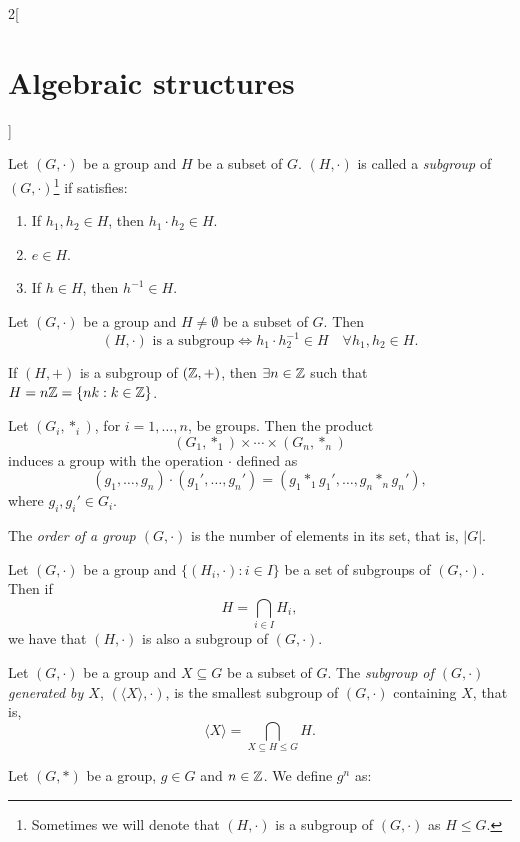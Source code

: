 \documentclass[../../../main.tex]{subfiles}
\begin{document}
\begin{multicols}{2}[\section{Algebraic structures}]
\begin{lemma}
\end{lemma}
\begin{definition}[Subgroup]
    Let $(G,\cdot)$ be a group and $H$ be a subset of $G$. $(H,\cdot)$ is called a \textit{subgroup} of $(G,\cdot)$\footnote{Sometimes we will denote that $(H,\cdot)$ is a subgroup of $(G,\cdot)$ as $H\leq G$.} if satisfies:
    \begin{enumerate}
        \item If $h_1,h_2\in H$, then $h_1\cdot h_2\in H$.
        \item $e\in H$.
        \item If $h\in H$, then $h^{-1}\in H$.
    \end{enumerate}
\end{definition}
\begin{prop}
    Let $(G,\cdot)$ be a group and $H\ne\emptyset$ be a subset of $G$. Then $$(H,\cdot)\text{ is a subgroup}\iff h_1\cdot h_2^{-1}\in H\quad\forall h_1,h_2\in H.$$
\end{prop}
\begin{prop}
    If $(H,+)$ is a subgroup of $(\mathbb{Z} ,+)$, then $\exists n\in\mathbb{Z} $ such that $H=n\mathbb{Z} =\{nk:k\in\mathbb{Z} \}$.
\end{prop}
\begin{prop}
    Let $(G_i,*_i)$, for $i=1,\ldots, n$, be groups. Then the product $$(G_1,*_1)\times\cdots\times(G_n,*_n)$$ induces a group with the operation $\cdot$ defined as $$(g_1,\ldots,g_n)\cdot(g_1',\ldots,g_n')=(g_1*_1g_1',\ldots,g_n*_ng_n'),$$ where $g_i,g_i'\in G_i$.
\end{prop}
\begin{definition}
    The \textit{order of a group $(G,\cdot)$} is the number of elements in its set, that is, $|G|$.
\end{definition}
\begin{lemma}
    Let $(G,\cdot)$ be a group and $\{(H_i,\cdot):i\in I\}$ be a set of subgroups of $(G,\cdot)$. Then if $$H=\displaystyle\bigcap_{i\in I}H_i,$$ we have that $(H,\cdot)$ is also a subgroup of $(G,\cdot)$.
\end{lemma}
\begin{definition}
    Let $(G,\cdot)$ be a group and $X\subseteq G$ be a subset of $G$. The \textit{subgroup of $(G,\cdot)$ generated by $X$}, $(\langle X\rangle,\cdot)$, is the smallest subgroup of $(G,\cdot)$ containing $X$, that is, $$\langle X\rangle=\bigcap_{X\subseteq H\leq G}H.$$
\end{definition}
\begin{definition}
    Let $(G,*)$ be a group, $g\in G$ and $n\in\mathbb{Z} $. We define $g^n$ as: 

\end{definition}
\end{multicols}
\end{document}
